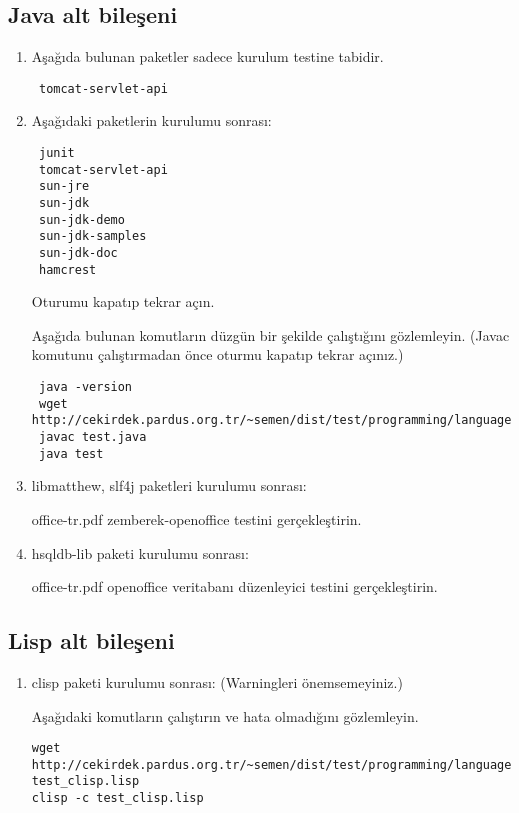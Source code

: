 \documentclass[a4paper,10pt]{article}
\begin{document}
\subsection{Java alt bileşeni}
\begin{enumerate}
\item Aşağıda bulunan paketler sadece kurulum testine tabidir.

\begin{verbatim}
 tomcat-servlet-api
\end{verbatim}

 \item Aşağıdaki paketlerin kurulumu sonrası:
\begin{verbatim}
 junit
 tomcat-servlet-api
 sun-jre
 sun-jdk
 sun-jdk-demo
 sun-jdk-samples
 sun-jdk-doc
 hamcrest
\end{verbatim}

Oturumu kapatıp tekrar açın.

Aşağıda bulunan komutların düzgün bir şekilde çalıştığını gözlemleyin. (Javac komutunu çalıştırmadan önce oturmu kapatıp tekrar açınız.)
\begin{verbatim}
 java -version
 wget http://cekirdek.pardus.org.tr/~semen/dist/test/programming/language/java/test.java
 javac test.java
 java test
\end{verbatim}

\item libmatthew, slf4j paketleri kurulumu sonrası:

office-tr.pdf zemberek-openoffice testini gerçekleştirin.

\item hsqldb-lib paketi kurulumu sonrası: 

office-tr.pdf openoffice veritabanı düzenleyici testini gerçekleştirin.

\end{enumerate}



\subsection{Lisp alt bileşeni}
\begin{enumerate}
 \item clisp paketi kurulumu sonrası: (Warningleri önemsemeyiniz.)

Aşağıdaki komutların çalıştırın ve hata olmadığını gözlemleyin.
\begin{verbatim}
wget http://cekirdek.pardus.org.tr/~semen/dist/test/programming/language/lisp/
test_clisp.lisp 
clisp -c test_clisp.lisp
\end{verbatim}

\end{enumerate}
\end{document}

